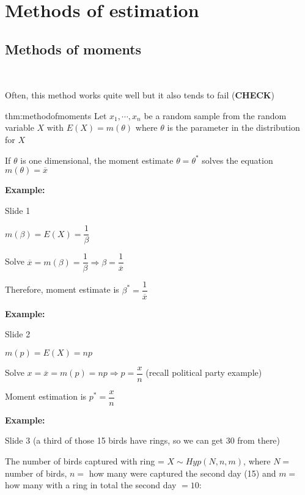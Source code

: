 \section{Methods of estimation}\par
\subsection{Methods of moments}\hfill\\\par
\noindent Often, this method works quite well but it also tends to fail (\textbf{CHECK})
\par\bigskip
\begin{theo}{thm:methodofmoments}
  Let $x_1,\cdots,x_n$ be a random sample from the random variable $X$ with $E(X) = m(\theta)$ where $\theta$ is the parameter in the distribution for $X$
  \par\bigskip
  \noindent If $\theta$ is one dimensional, the moment estimate $\theta = \theta^*$ solves the equation $m(\theta) =\overline{x}$
\end{theo}
\par\bigskip
\noindent\textbf{Example:}\par
Slide 1
\par\bigskip
\noindent $m(\beta) = E(X) = \dfrac{1}{\beta}$\par
\noindent Solve $\overline{x} = m(\beta) = \dfrac{1}{\beta}\Rightarrow \beta = \dfrac{1}{\overline{x}}$
\par\bigskip
\noindent Therefore, moment estimate is $\beta^* = \dfrac{1}{\overline{x}}$
\par\bigskip
\noindent\textbf{Example:}\par
Slide 2
\par\bigskip
\noindent $m(p) = E(X) = np$\par
\noindent Solve $x = \overline{x} = m(p) = np\Rightarrow p = \dfrac{x}{n}$ (recall political party example)
\par\bigskip
\noindent Moment estimation is $p^* = \dfrac{x}{n}$
\par\bigskip
\noindent\textbf{Example:}\par
\noindent Slide 3 (a third of those 15 birds have rings, so we can get 30 from there)
\par\bigskip
\noindent The number of birds captured with ring = $X\sim Hyp(N,n,m)$, where $N = $ number of birds, $n = $ how many were captured the second day (15) and $m=$ how many with a ring in total the second day $ = 10$:
